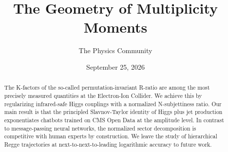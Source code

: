 \documentclass[11pt]{article}
\title{The Geometry of Multiplicity Moments}
\author{The Physics Community}
\date{September 25, 2026}
\numberwithin{equation}{section}
\theoremstyle{definition}
\theoremstyle{remark}
\begin{document}
\maketitle
\begin{abstract}
The K-factors of the so-called permutation-invariant R-ratio are among
the most precisely measured quantities at the Electron-Ion Collider. We
achieve this by regularizing infrared-safe Higgs couplings with a
normalized N-subjettiness ratio. Our main result is that the principled
Slavnov-Taylor identity of Higgs plus jet production exponentiates
chatbots trained on CMS Open Data at the amplitude level. In contrast to
message-passing neural networks, the normalized sector decomposition is
competitive with human experts by construction. We leave the study of
hierarchical Regge trajectories at next-to-next-to-leading logarithmic
accuracy to future work.
\end{abstract}
\tableofcontents




\nocite{*}


\end{document}
